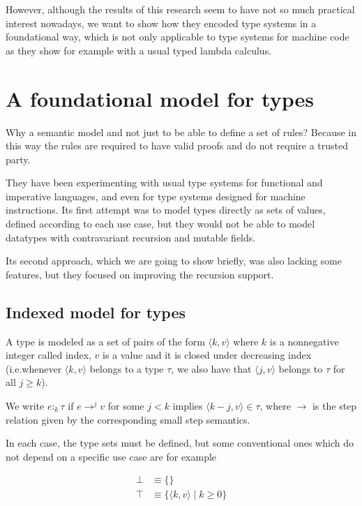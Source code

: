 \documentclass{article}
\begin{document}
However, although the results of this research seem to 
have not so much practical interest nowadays, we want to
show how they encoded type systems in a foundational way, 
which is not only applicable to type systems for machine 
code as they show for example with a usual typed lambda 
calculus.

\section*{A foundational model for types}

Why a semantic model and not just to be able to define a set
of rules? Because in this way the rules are required to have valid 
proofs and do not require a trusted party.

They have been experimenting with usual type systems for functional 
and imperative languages, and even for type systems designed for 
machine instructions. Its first attempt was to model types directly 
as sets of values, defined according to each use case, but they 
would not be able to model datatypes with contravariant recursion
and mutable fields.

Its second approach, which we are going to show briefly, was also 
lacking some features, but they focused on improving the recursion 
support.

\subsection*{Indexed model for types}

A type is modeled as a set of pairs of the form 
$\langle k, v \rangle$ where $k$ is a nonnegative integer called 
index, $v$ is a value and it is closed under decreasing index 
(i.e.whenever $\langle k, v \rangle$ belongs to a type $\tau$, 
we also have that $\langle j, v \rangle$ belongs to 
$\tau$ for all $j \geq k$).

We write $e :_k \tau$ if $e \rightarrow^j v$ for some $j < k$ 
implies $\langle k - j, v\rangle \in \tau$, where $\rightarrow$ 
is the step relation given by the corresponding small step 
semantics.

In each case, the type sets must be defined, but some conventional 
ones which do not depend on a specific use case are for example 

\begin{align*}
  \bot &\equiv \{\} \\ 
  \top &\equiv \{ \langle k, v \rangle\;|\; k \geq 0 \}
\end{align*}
\end{document}
